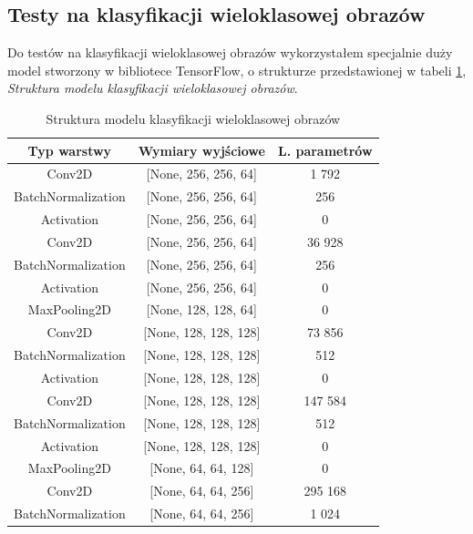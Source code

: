 \subsection{Testy na klasyfikacji wieloklasowej obrazów}
Do testów na klasyfikacji wieloklasowej obrazów wykorzystałem specjalnie duży model stworzony w bibliotece TensorFlow, o strukturze przedstawionej w tabeli \ref{tab:multiclass_image_model_structure}, \textit{Struktura modelu klasyfikacji wieloklasowej obrazów}. \\
\begin{table}[htbp]
    \centering
    \caption{Struktura modelu klasyfikacji wieloklasowej obrazów}
    \label{tab:multiclass_image_model_structure}
    \begin{tabular}{|c|c|c|}
        \hline
        \textbf{Typ warstwy} & \textbf{Wymiary wyjściowe} & \textbf{L. parametrów} \\
        \hline
        Conv2D & [None, 256, 256, 64] & 1 792 \\
        \hline
        BatchNormalization & [None, 256, 256, 64] & 256 \\
        \hline
        Activation & [None, 256, 256, 64] & 0 \\
        \hline
        Conv2D & [None, 256, 256, 64] & 36 928 \\
        \hline
        BatchNormalization & [None, 256, 256, 64] & 256 \\
        \hline
        Activation & [None, 256, 256, 64] & 0 \\
        \hline
        MaxPooling2D & [None, 128, 128, 64] & 0 \\
        \hline
        Conv2D & [None, 128, 128, 128] & 73 856 \\
        \hline
        BatchNormalization & [None, 128, 128, 128] & 512 \\
        \hline
        Activation & [None, 128, 128, 128] & 0 \\
        \hline
        Conv2D & [None, 128, 128, 128] & 147 584 \\
        \hline
        BatchNormalization & [None, 128, 128, 128] & 512 \\
        \hline
        Activation & [None, 128, 128, 128] & 0 \\
        \hline
        MaxPooling2D & [None, 64, 64, 128] & 0 \\
        \hline
        Conv2D & [None, 64, 64, 256] & 295 168 \\
        \hline
        BatchNormalization & [None, 64, 64, 256] & 1 024 \\

\end{tabular}
\end{table}

